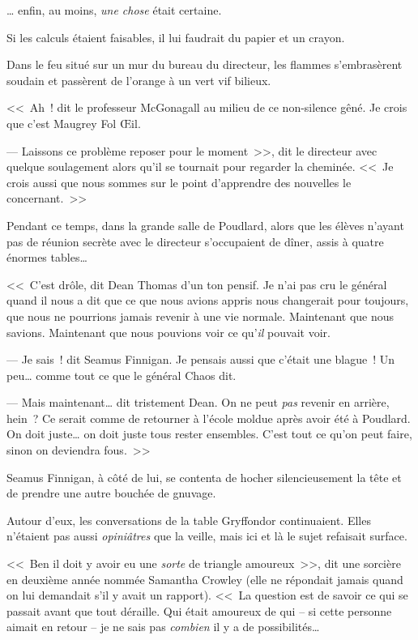 … enfin, au moins, \emph{une chose} était certaine.

Si les calculs étaient faisables, il lui faudrait du papier et un crayon.

Dans le feu situé sur un mur du bureau du directeur, les flammes s'embrasèrent soudain et passèrent de l'orange à un vert vif bilieux.

<<~Ah~! dit le professeur McGonagall au milieu de ce non-silence gêné. Je crois que c'est Maugrey Fol Œil.

--- Laissons ce problème reposer pour le moment~>>, dit le directeur avec quelque soulagement alors qu'il se tournait pour regarder la cheminée. <<~Je crois aussi que nous sommes sur le point d'apprendre des nouvelles le concernant.~>>


Pendant ce temps, dans la grande salle de Poudlard, alors que les élèves n'ayant pas de réunion secrète avec le directeur s'occupaient de dîner, assis à quatre énormes tables…

<<~C'est drôle, dit Dean Thomas d'un ton pensif. Je n'ai pas cru le général quand il nous a dit que ce que nous avions appris nous changerait pour toujours, que nous ne pourrions jamais revenir à une vie normale. Maintenant que nous savions. Maintenant que nous pouvions voir ce qu'\emph{il} pouvait voir.

--- Je sais~! dit Seamus Finnigan. Je pensais aussi que c'était une blague~! Un peu… comme tout ce que le général Chaos dit.

--- Mais maintenant… dit tristement Dean. On ne peut \emph{pas} revenir en arrière, hein~? Ce serait comme de retourner à l'école moldue après avoir été à Poudlard. On doit juste… on doit juste tous rester ensembles. C'est tout ce qu'on peut faire, sinon on deviendra fous.~>>

Seamus Finnigan, à côté de lui, se contenta de hocher silencieusement la tête et de prendre une autre bouchée de gnuvage.

Autour d'eux, les conversations de la table Gryffondor continuaient. Elles n'étaient pas aussi \emph{opiniâtres} que la veille, mais ici et là le sujet refaisait surface.

<<~Ben il doit y avoir eu une \emph{sorte} de triangle amoureux~>>, dit une sorcière en deuxième année nommée Samantha Crowley (elle ne répondait jamais quand on lui demandait s'il y avait un rapport). <<~La question est de savoir ce qui se passait avant que tout déraille. Qui était amoureux de qui -- si cette personne aimait en retour -- je ne sais pas \emph{combien} il y a de possibilités…

